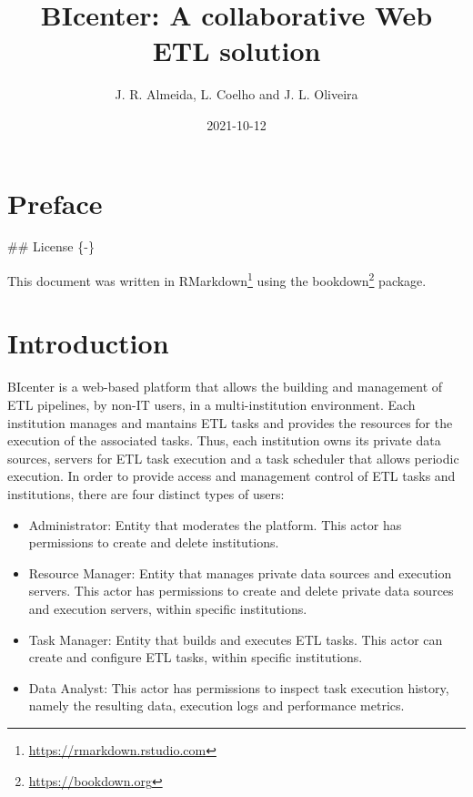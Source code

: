 \documentclass[
  11pt,
]{krantz}
\title{BIcenter: A collaborative Web ETL solution}
\author{J. R. Almeida, L. Coelho and J. L. Oliveira}
\date{2021-10-12}
\providecommand{\tightlist}{%
  \setlength{\itemsep}{0pt}\setlength{\parskip}{0pt}}
\renewcommand{\href}[2]{#2\footnote{\url{#1}}}
\begin{document}
\maketitle

{
\hypersetup{linkcolor=}
\setcounter{tocdepth}{1}
\tableofcontents
}
\listoffigures
\listoftables
\hypertarget{preface}{%
\chapter*{Preface}\label{preface}}


\#\# License \{-\}

This document was written in \href{https://rmarkdown.rstudio.com}{RMarkdown} using the \href{https://bookdown.org}{bookdown} package.

\mainmatter

\hypertarget{introduction}{%
\chapter{Introduction}\label{introduction}}

BIcenter is a web-based platform that allows the building and management of ETL pipelines, by non-IT users, in a multi-institution environment. Each institution manages and mantains ETL tasks and provides the resources for the execution of the associated tasks. Thus, each institution owns its private data sources, servers for ETL task execution and a task scheduler that allows periodic execution. In order to provide access and management control of ETL tasks and institutions, there are four distinct types of users:

\begin{itemize}
\tightlist
\item
  Administrator: Entity that moderates the platform. This actor has permissions to create and delete institutions.
\item
  Resource Manager: Entity that manages private data sources and execution servers. This actor has permissions to create and delete private data sources and execution servers, within specific institutions.
\item
  Task Manager: Entity that builds and executes ETL tasks. This actor can create and configure ETL tasks, within specific institutions.
\item
  Data Analyst: This actor has permissions to inspect task execution history, namely the resulting data, execution logs and performance metrics.
\end{itemize}
\end{document}
